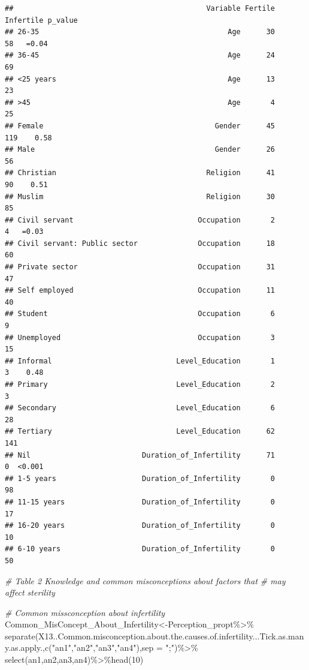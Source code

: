\documentclass[
]{article}
\newenvironment{Shaded}{\begin{snugshade}}{\end{snugshade}}
\newcommand{\AttributeTok}[1]{\textcolor[rgb]{0.77,0.63,0.00}{#1}}
\newcommand{\CommentTok}[1]{\textcolor[rgb]{0.56,0.35,0.01}{\textit{#1}}}
\newcommand{\DecValTok}[1]{\textcolor[rgb]{0.00,0.00,0.81}{#1}}
\newcommand{\FunctionTok}[1]{\textcolor[rgb]{0.00,0.00,0.00}{#1}}
\newcommand{\NormalTok}[1]{#1}
\newcommand{\OtherTok}[1]{\textcolor[rgb]{0.56,0.35,0.01}{#1}}
\newcommand{\SpecialCharTok}[1]{\textcolor[rgb]{0.00,0.00,0.00}{#1}}
\newcommand{\StringTok}[1]{\textcolor[rgb]{0.31,0.60,0.02}{#1}}
\begin{document}
\begin{verbatim}
##                                             Variable Fertile Infertile p_value
## 26-35                                            Age      30        58   =0.04
## 36-45                                            Age      24        69        
## <25 years                                        Age      13        23        
## >45                                              Age       4        25        
## Female                                        Gender      45       119    0.58
## Male                                          Gender      26        56        
## Christian                                   Religion      41        90    0.51
## Muslim                                      Religion      30        85        
## Civil servant                             Occupation       2         4   =0.03
## Civil servant: Public sector              Occupation      18        60        
## Private sector                            Occupation      31        47        
## Self employed                             Occupation      11        40        
## Student                                   Occupation       6         9        
## Unemployed                                Occupation       3        15        
## Informal                             Level_Education       1         3    0.48
## Primary                              Level_Education       2         3        
## Secondary                            Level_Education       6        28        
## Tertiary                             Level_Education      62       141        
## Nil                          Duration_of_Infertility      71         0  <0.001
## 1-5 years                    Duration_of_Infertility       0        98        
## 11-15 years                  Duration_of_Infertility       0        17        
## 16-20 years                  Duration_of_Infertility       0        10        
## 6-10 years                   Duration_of_Infertility       0        50
\end{verbatim}

\begin{Shaded}
\begin{Highlighting}[]
\CommentTok{\# Table 2 Knowledge and common misconceptions about factors that }
\CommentTok{\# may affect sterility}

\CommentTok{\# Common missconception about infertility}
\NormalTok{Common\_MisConcept\_About\_Infertility}\OtherTok{\textless{}{-}}\NormalTok{Perception\_propt}\SpecialCharTok{\%\textgreater{}\%}
  \FunctionTok{separate}\NormalTok{(X13..Common.misconception.about.the.causes.of.infertility...Tick.as.many.as.apply.,}\FunctionTok{c}\NormalTok{(}\StringTok{"an1"}\NormalTok{,}\StringTok{"an2"}\NormalTok{,}\StringTok{"an3"}\NormalTok{,}\StringTok{"an4"}\NormalTok{),}\AttributeTok{sep =} \StringTok{";"}\NormalTok{)}\SpecialCharTok{\%\textgreater{}\%}
  \FunctionTok{select}\NormalTok{(an1,an2,an3,an4)}\SpecialCharTok{\%\textgreater{}\%}\FunctionTok{head}\NormalTok{(}\DecValTok{10}\NormalTok{)}
\end{Highlighting}
\end{Shaded}
\end{document}
